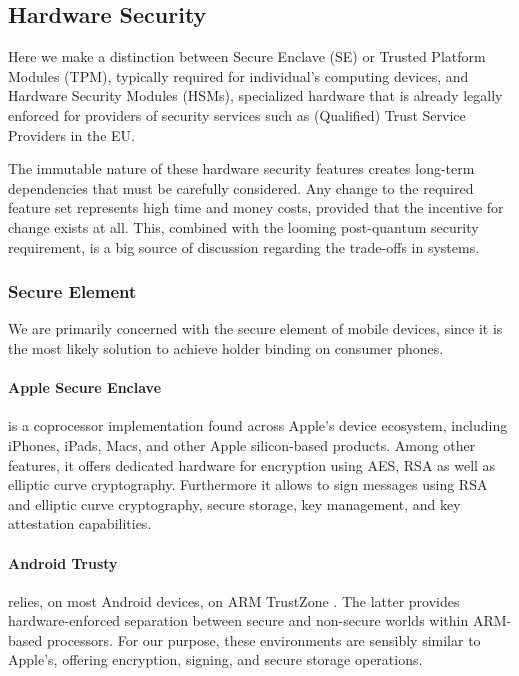 
\subsection{Hardware Security}

Here we make a distinction between Secure Enclave (SE) or Trusted Platform Modules (TPM), typically required for individual's computing devices, and Hardware Security Modules (HSMs), specialized hardware that is already legally enforced for providers of security services such as (Qualified) Trust Service Providers in the EU.

The immutable nature of these hardware security features creates long-term dependencies that must be carefully considered. Any change to the required feature set represents high time and money costs, provided that the incentive for change exists at all. This, combined with the looming post-quantum security requirement, is a big source of discussion regarding the trade-offs in \eid systems.


\subsubsection{Secure Element} 

We are primarily concerned with the secure element of mobile devices, since it is the most likely solution to achieve holder binding on consumer phones.

\paragraph{Apple Secure Enclave} \cite{apple-secure-enclaves} is a coprocessor implementation found across Apple's device ecosystem, including iPhones, iPads, Macs, and other Apple silicon-based products. Among other features, it offers dedicated hardware for encryption using AES, RSA as well as elliptic curve cryptography.
Furthermore it allows to sign messages using RSA and elliptic curve cryptography, secure storage, key management, and key attestation capabilities.

\paragraph{Android Trusty} \cite{trusty} relies, on most Android devices, on ARM TrustZone \cite{arm-trustzone}. 
The latter provides hardware-enforced separation between secure and non-secure worlds within ARM-based processors.
For our purpose, these environments are sensibly similar to Apple's, offering encryption, signing, and secure storage operations.

